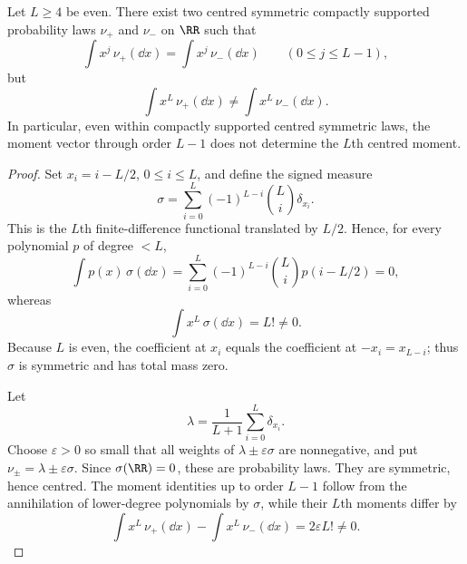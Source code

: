 \begin{lemma}%
\label{lem:lower-moment-realizability-obstruction}
Let \(L\ge4\) be even.  There exist two centred symmetric compactly
supported probability laws \(\nu_+\) and \(\nu_-\) on \(\RR\) such that
\[
  \int x^j\,\nu_+(\dd x)=\int x^j\,\nu_-(\dd x)
  \qquad(0\le j\le L-1),
\]
but
\[
  \int x^L\,\nu_+(\dd x)\ne \int x^L\,\nu_-(\dd x).
\]
In particular, even within compactly supported centred symmetric laws, the
moment vector through order \(L-1\) does not determine the \(L\)th centred
moment.
\end{lemma}

\ifdefined\JFAArticleMain
{}
\else
\begin{proof}
Set \(x_i=i-L/2\), \(0\le i\le L\), and define the signed measure
\[
  \sigma=\sum_{i=0}^{L}(-1)^{L-i}\binom{L}{i}\delta_{x_i}.
\]
This is the \(L\)th finite-difference functional translated by \(L/2\).
Hence, for every polynomial \(p\) of degree \(<L\),
\[
  \int p(x)\,\sigma(\dd x)
  =\sum_{i=0}^{L}(-1)^{L-i}\binom{L}{i}p(i-L/2)=0,
\]
whereas
\[
  \int x^L\,\sigma(\dd x)=L!\ne0 .
\]
Because \(L\) is even, the coefficient at \(x_i\) equals the coefficient at
\(-x_i=x_{L-i}\); thus \(\sigma\) is symmetric and has total mass zero.

Let
\[
  \lambda=\frac1{L+1}\sum_{i=0}^{L}\delta_{x_i}.
\]
Choose \(\varepsilon>0\) so small that all weights of
\(\lambda\pm\varepsilon\sigma\) are nonnegative, and put
\(\nu_\pm=\lambda\pm\varepsilon\sigma\).  Since \(\sigma(\RR)=0\), these are
probability laws.  They are symmetric, hence centred.  The moment identities
up to order \(L-1\) follow from the annihilation of lower-degree
polynomials by \(\sigma\), while their \(L\)th moments differ by
\[
  \int x^L\,\nu_+(\dd x)-\int x^L\,\nu_-(\dd x)
  =2\varepsilon L!\ne0 .
\]
\end{proof}
\fi

